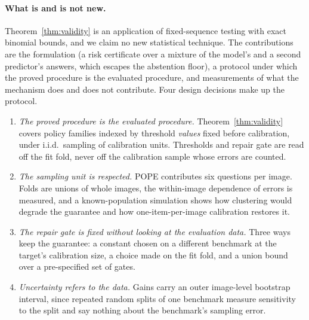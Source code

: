 \paragraph{What is and is not new.}
Theorem~\ref{thm:validity} is an application of fixed-sequence testing \citep{angelopoulos2021ltt} with exact binomial bounds, and we claim no new
statistical technique. The contributions are the formulation (a risk certificate over a mixture of the model's and a second predictor's
answers, which escapes the abstention floor), a protocol under which the proved procedure is the evaluated procedure, and measurements of what the
mechanism does and does not contribute. Four design decisions make up the protocol.

\begin{enumerate}
\item \emph{The proved procedure is the evaluated procedure.} Theorem~\ref{thm:validity} covers policy families indexed by threshold
  \emph{values} fixed before calibration, under i.i.d.\ sampling of calibration units. Thresholds and repair gate are read off the fit fold,
  never off the calibration sample whose errors are counted.
\item \emph{The sampling unit is respected.} POPE contributes six questions per image. Folds are unions of whole images, the within-image
  dependence of errors is measured, and a known-population simulation shows how clustering would degrade the guarantee and how
  one-item-per-image calibration restores it.
\item \emph{The repair gate is fixed without looking at the evaluation data.} Three ways keep the guarantee: a constant chosen on a
  different benchmark at the target's calibration size, a choice made on the fit fold, and a union bound over a pre-specified set of gates.
\item \emph{Uncertainty refers to the data.} Gains carry an outer image-level bootstrap interval, since repeated random splits of one
  benchmark measure sensitivity to the split and say nothing about the benchmark's sampling error.
\end{enumerate}

